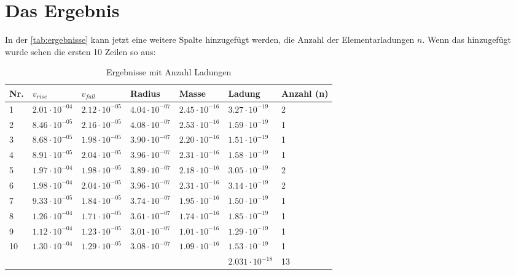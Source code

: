 \section{Das Ergebnis}\label{sec:ergebnis}
In der \autoref{tab:ergebnisse} kann jetzt eine weitere Spalte hinzugefügt werden, die Anzahl der Elementarladungen $n$. Wenn das hinzugefügt wurde sehen die ersten 10 Zeilen so aus:

\begin{table}[H]
	\centering
	\begin{tabular}{llllll|l}
		\toprule
		Nr. & $v_{rise}$ & $v_{fall}$ & Radius & Masse & Ladung & Anzahl (n) \\
		\midrule
		1 &$\mathrm{2.01 \cdot 10^{-04}}$ & $\mathrm{2.12 \cdot 10^{-05}}$ & $\mathrm{4.04 \cdot 10^{-07}}$ & $\mathrm{2.45 \cdot 10^{-16}}$ & $\mathrm{3.27 \cdot 10^{-19}}$ & 2\\
		2 &$\mathrm{8.46 \cdot 10^{-05}}$ & $\mathrm{2.16 \cdot 10^{-05}}$ & $\mathrm{4.08 \cdot 10^{-07}}$ & $\mathrm{2.53 \cdot 10^{-16}}$ & $\mathrm{1.59 \cdot 10^{-19}}$ & 1\\
		3 &$\mathrm{8.68 \cdot 10^{-05}}$ & $\mathrm{1.98 \cdot 10^{-05}}$ & $\mathrm{3.90 \cdot 10^{-07}}$ & $\mathrm{2.20 \cdot 10^{-16}}$ & $\mathrm{1.51 \cdot 10^{-19}}$ & 1\\
		4 &$\mathrm{8.91 \cdot 10^{-05}}$ & $\mathrm{2.04 \cdot 10^{-05}}$ & $\mathrm{3.96 \cdot 10^{-07}}$ & $\mathrm{2.31 \cdot 10^{-16}}$ & $\mathrm{1.58 \cdot 10^{-19}}$ & 1\\
		5 &$\mathrm{1.97 \cdot 10^{-04}}$ & $\mathrm{1.98 \cdot 10^{-05}}$ & $\mathrm{3.89 \cdot 10^{-07}}$ & $\mathrm{2.18 \cdot 10^{-16}}$ & $\mathrm{3.05 \cdot 10^{-19}}$ & 2\\
		6 &$\mathrm{1.98 \cdot 10^{-04}}$ & $\mathrm{2.04 \cdot 10^{-05}}$ & $\mathrm{3.96 \cdot 10^{-07}}$ & $\mathrm{2.31 \cdot 10^{-16}}$ & $\mathrm{3.14 \cdot 10^{-19}}$ & 2\\
		7 &$\mathrm{9.33 \cdot 10^{-05}}$ & $\mathrm{1.84 \cdot 10^{-05}}$ & $\mathrm{3.74 \cdot 10^{-07}}$ & $\mathrm{1.95 \cdot 10^{-16}}$ & $\mathrm{1.50 \cdot 10^{-19}}$ & 1\\
		8 &$\mathrm{1.26 \cdot 10^{-04}}$ & $\mathrm{1.71 \cdot 10^{-05}}$ & $\mathrm{3.61 \cdot 10^{-07}}$ & $\mathrm{1.74 \cdot 10^{-16}}$ & $\mathrm{1.85 \cdot 10^{-19}}$ & 1\\
		9 &$\mathrm{1.12 \cdot 10^{-04}}$ & $\mathrm{1.23 \cdot 10^{-05}}$ & $\mathrm{3.01 \cdot 10^{-07}}$ & $\mathrm{1.01 \cdot 10^{-16}}$ & $\mathrm{1.29 \cdot 10^{-19}}$ & 1\\
		10 &$\mathrm{1.30 \cdot 10^{-04}}$ & $\mathrm{1.29 \cdot 10^{-05}}$ & $\mathrm{3.08 \cdot 10^{-07}}$ & $\mathrm{1.09 \cdot 10^{-16}}$ & $\mathrm{1.53 \cdot 10^{-19}}$ & 1\\
		\bottomrule
		&&&&& $2.031 \cdot 10^{-18}$ & 13 \\
	\end{tabular}
	\caption{Ergebnisse mit Anzahl Ladungen}
	\label{tab:anzahlLadung}
\end{table}
